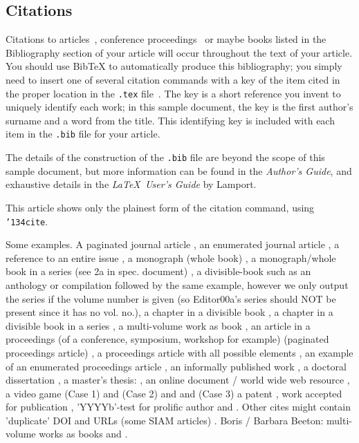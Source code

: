 \subsection{Citations}
Citations to articles~\cite{bowman:reasoning,
clark:pct, braams:babel, herlihy:methodology},
conference proceedings~\cite{clark:pct} or maybe
books \cite{Lamport:LaTeX, salas:calculus} listed
in the Bibliography section of your
article will occur throughout the text of your article.
You should use BibTeX to automatically produce this bibliography;
you simply need to insert one of several citation commands with
a key of the item cited in the proper location in
the \texttt{.tex} file~\cite{Lamport:LaTeX}.
The key is a short reference you invent to uniquely
identify each work; in this sample document, the key is
the first author's surname and a
word from the title.  This identifying key is included
with each item in the \texttt{.bib} file for your article.

The details of the construction of the \texttt{.bib} file
are beyond the scope of this sample document, but more
information can be found in the \textit{Author's Guide},
and exhaustive details in the \textit{\LaTeX\ User's
Guide} by Lamport.

This article shows only the plainest form
of the citation command, using \texttt{{\char'134}cite}.

Some examples.  A paginated journal article \cite{Abril07}, an enumerated
journal article \cite{Cohen07}, a reference to an entire issue \cite{JCohen96},
a monograph (whole book) \cite{Kosiur01}, a monograph/whole book in a series (see 2a in spec. document)
\cite{Harel79}, a divisible-book such as an anthology or compilation \cite{Editor00}
followed by the same example, however we only output the series if the volume number is given
\cite{Editor00a} (so Editor00a's series should NOT be present since it has no vol. no.),
a chapter in a divisible book \cite{Spector90}, a chapter in a divisible book
in a series \cite{Douglass98}, a multi-volume work as book \cite{Knuth97},
an article in a proceedings (of a conference, symposium, workshop for example)
(paginated proceedings article) \cite{Andler79}, a proceedings article
with all possible elements \cite{Smith10}, an example of an enumerated
proceedings article \cite{VanGundy07},
an informally published work \cite{Harel78}, a doctoral dissertation \cite{Clarkson85},
a master's thesis: \cite{anisi03}, an online document / world wide web
resource \cite{Thornburg01, Ablamowicz07, Poker06}, a video game (Case 1) \cite{Obama08} and (Case 2) \cite{Novak03}
and \cite{Lee05} and (Case 3) a patent \cite{JoeScientist001},
work accepted for publication \cite{rous08}, 'YYYYb'-test for prolific author
\cite{SaeediMEJ10} and \cite{SaeediJETC10}. Other cites might contain
'duplicate' DOI and URLs (some SIAM articles) \cite{Kirschmer:2010:AEI:1958016.1958018}.
Boris / Barbara Beeton: multi-volume works as books
\cite{MR781536} and \cite{MR781537}.

